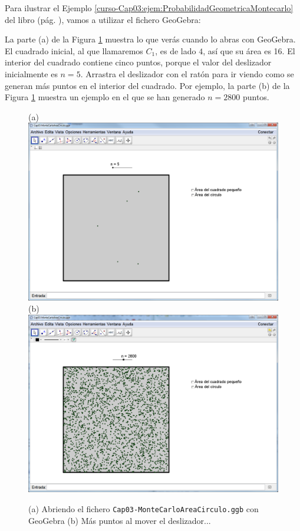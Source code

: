 \documentclass[10pt,a4paper]{article}\usepackage[]{graphicx}\usepackage[]{color}
\newcounter {cont01}
\begin{document}
Para ilustrar el Ejemplo \ref{curso-Cap03:ejem:ProbabilidadGeometricaMontecarlo} del libro (pág. \pageref{curso-Cap03:ejem:ProbabilidadGeometricaMontecarlo}), vamos a utilizar el fichero GeoGebra:
\begin{center}
\end{center}
La parte (a) de la Figura \ref{tut03:fig:MontecarloAreaCirculo01} muestra lo que verás cuando lo abras con GeoGebra. El cuadrado inicial, al que llamaremos $C_1$, es de lado $4$, así que su área es 16. El interior del cuadrado contiene cinco puntos, porque el valor del deslizador inicialmente es $n=5$. Arrastra el deslizador con el ratón para ir viendo como se generan más puntos en el interior del cuadrado. Por ejemplo, la parte (b) de la Figura \ref{tut03:fig:MontecarloAreaCirculo01} muestra un ejemplo en el que se han generado  $n=2800$ puntos.
\begin{figure}[p]
    \begin{center}
    (a)\\[3mm]
    \includegraphics[width=15cm]{../fig/Tut03-43.png}\\[3mm]
    (b)\\[3mm]
    \includegraphics[width=15cm]{../fig/Tut03-44.png}
    \end{center}
  \caption{(a) Abriendo el fichero {\tt Cap03-MonteCarloAreaCirculo.ggb} con GeoGebra (b) Más puntos al mover el deslizador...}
  \label{tut03:fig:MontecarloAreaCirculo01}
\end{figure}
\end{document}
